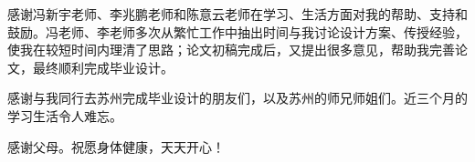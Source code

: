 \begin{thankspage}
感谢冯新宇老师、李兆鹏老师和陈意云老师在学习、生活方面对我的帮助、支持和鼓励。冯老师、李老师多次从繁忙工作中抽出时间与我讨论设计方案、传授经验，使我在较短时间内理清了思路；论文初稿完成后，又提出很多意见，帮助我完善论文，最终顺利完成毕业设计。

感谢与我同行去苏州完成毕业设计的朋友们，以及苏州的师兄师姐们。近三个月的学习生活令人难忘。

感谢父母。祝愿身体健康，天天开心！
\end{thankspage}
